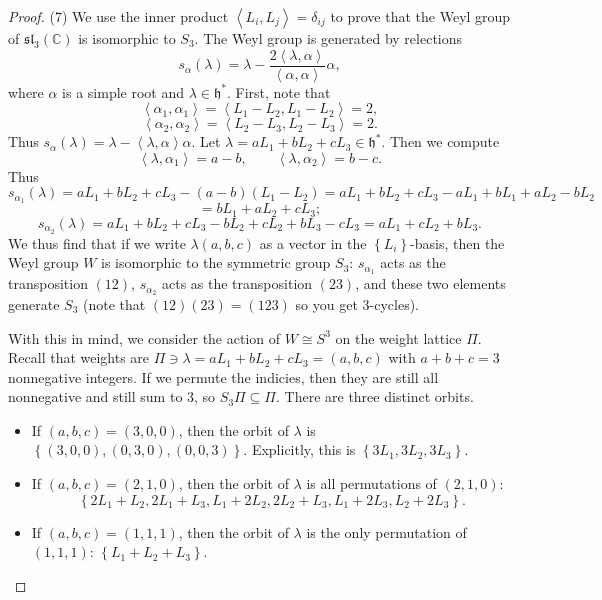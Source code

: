 \documentclass[11pt, letterpaper]{article}
\theoremstyle{plain}
\begin{document}
\begin{proof}
	(7) We use the inner product $\left\langle L_i,L_j \right\rangle =\delta _{ij} $ to prove that the Weyl group of $\mathfrak{sl} _3(\mathbb{C} )$ is isomorphic to $S_3$. The Weyl group is generated by relections
	\[
		s_\alpha (\lambda )=\lambda -\frac{2\left\langle \lambda ,\alpha  \right\rangle }{\left\langle \alpha ,\alpha  \right\rangle } \alpha ,
	\]
	where $\alpha $ is a simple root and $\lambda \in \mathfrak{h} ^*$. First, note that
	\[
		\left\langle \alpha_1,\alpha _1 \right\rangle =\left\langle L_1-L_2,L_1-L_2 \right\rangle =2,
	\]
	\[
		\left\langle \alpha _2,\alpha _2 \right\rangle =\left\langle L_2-L_3,L_2-L_3 \right\rangle =2
	.\]
	Thus $s_\alpha (\lambda )=\lambda -\left\langle \lambda ,\alpha  \right\rangle \alpha $. Let $\lambda =aL_1+bL_2+cL_3\in \mathfrak{h} ^*$. Then we compute
	\[
		\left\langle \lambda ,\alpha _1 \right\rangle =a-b,\qquad \left\langle \lambda ,\alpha _2 \right\rangle =b-c
	.\]
	Thus
	\[
		s_{\alpha _1} (\lambda )=aL_1 + bL_2 + cL_3 - (a-b)(L_1 - L_2) = aL_1 + bL_2 + cL_3 - aL_1 + bL_1 + aL_2 - bL_2
	\]
	\[
		=bL_1 + aL_2 + cL_3
	;\]
	\[
		s_{\alpha _2} (\lambda ) = aL_1 + bL_2 + cL_3 - bL_2 + cL_2 + bL_3 - cL_3 = aL_1 + cL_2 + bL_3
	.\]
	We thus find that if we write $\lambda (a,b,c)$ as a vector in the $\left\{ L_i \right\} $-basis, then the Weyl group $W$ is isomorphic to the symmetric group $S_3$: $s_{\alpha _1} $ acts as the transposition $(12)$, $s_{\alpha _2} $ acts as the transposition $(23)$, and these two elements generate $S_3$ (note that $(12)(23)=(123)$ so you get 3-cycles).

	With this in mind, we consider the action of $W\cong S^3$ on the weight lattice $\Pi $. Recall that weights are $\Pi \ni\lambda =aL_1 + bL_2 + cL_3 = (a,b,c)$ with $a+b+c=3$ nonnegative integers. If we permute the indicies, then they are still all nonnegative and still sum to 3, so $S_3\Pi  \subseteq \Pi $. There are three distinct orbits.

	\begin{itemize}
		\item If $(a,b,c) = (3,0,0)$, then the orbit of $\lambda $ is $\left\{ (3,0,0),(0,3,0),(0,0,3) \right\} $. Explicitly, this is $\left\{ 3L_1,3L_2,3L_3 \right\} $.
		\item If $(a,b,c) = (2,1,0)$, then the orbit of $\lambda $ is all permutations of $(2,1,0)$:
			\[
				\left\{ 2L_1 + L_2, 2L_1 + L_3, L_1 + 2L_2, 2L_2 + L_3, L_1 + 2L_3, L_2 + 2L_3 \right\} 
			.\]
		\item If $(a,b,c) = (1,1,1)$,  then the orbit of $\lambda $ is the only permutation of $(1,1,1)$: $\left\{ L_1 + L_2 + L_3 \right\} $.
	\end{itemize}
\end{proof}
\end{document}

